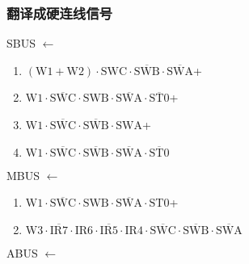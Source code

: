 \documentclass[UTF8]{ctexart}
\begin{document}
\subsubsection{翻译成硬连线信号}
\noindent SBUS $\leftarrow$
\begin{enumerate}[\indent\indent]
	\item $(\text{W1} + \text{W2}) \cdot \text{SWC} \cdot \overline{\text{SWB}} \cdot \overline{\text{SWA}}$+
	\item $\text{W1} \cdot \overline{\text{SWC}} \cdot \text{SWB} \cdot \overline{\text{SWA}} \cdot \overline {\text{ST0}}$+
	\item $\text{W1} \cdot \overline{\text{SWC}} \cdot\overline{\text{SWB}}\cdot  \text{SWA}$+
​	\item $\text{W1} \cdot \overline{\text{SWC}} \cdot\overline{\text{SWB}}\cdot \overline{\text{SWA}}\cdot \overline{\text{ST0}} $
\end{enumerate}
MBUS $\leftarrow$
\begin{enumerate}[\indent\indent]
	\item $\text{W1} \cdot \overline{\text{SWC}} \cdot \text{SWB} \cdot \overline{\text{SWA}} \cdot \text{ST0}$+
	\item $\text{W3} \cdot \overline{\text{IR7}} \cdot \text{IR6} \cdot \overline{\text{IR5}} \cdot \text{IR4} \cdot \overline{\text{SWC}} \cdot\overline{\text{SWB}}\cdot \overline{\text{SWA}}$
\end{enumerate}
ABUS $\leftarrow$
\end{document}

